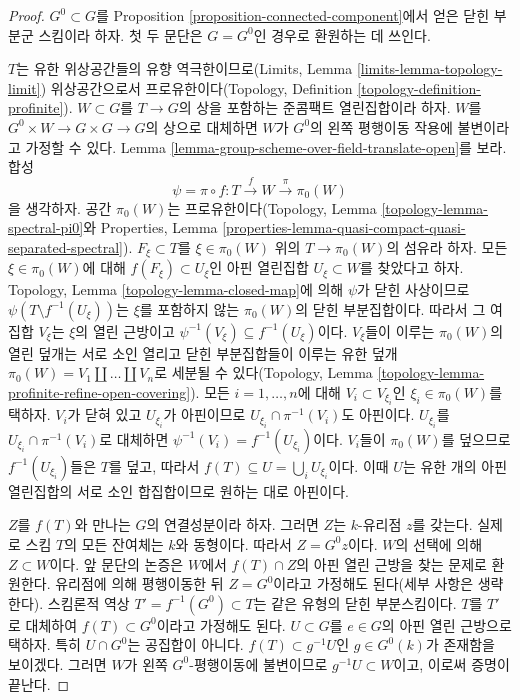 \begin{proof}
$G^0 \subset G$를 Proposition \ref{proposition-connected-component}에서 얻은 닫힌 부분군 스킴이라 하자.
첫 두 문단은 $G = G^0$인 경우로 환원하는 데 쓰인다.

\medskip\noindent
$T$는 유한 위상공간들의 유향 역극한이므로(Limits, Lemma
\ref{limits-lemma-topology-limit}) 위상공간으로서 프로유한이다(Topology, Definition
\ref{topology-definition-profinite}). $W \subset G$를 $T \to G$의 상을 포함하는 준콤팩트 열린집합이라 하자.
$W$를 $G^0 \times W \to G \times G \to G$의 상으로 대체하면 $W$가 $G^0$의 왼쪽 평행이동 작용에
불변이라고 가정할 수 있다. Lemma \ref{lemma-group-scheme-over-field-translate-open}를 보라.
합성
$$
\psi = \pi \circ f : T \xrightarrow{f} W \xrightarrow{\pi} \pi_0(W)
$$
을 생각하자. 공간 $\pi_0(W)$는 프로유한이다(Topology, Lemma
\ref{topology-lemma-spectral-pi0}와 Properties, Lemma
\ref{properties-lemma-quasi-compact-quasi-separated-spectral}). $F_\xi \subset T$를
$\xi \in \pi_0(W)$ 위의 $T \to \pi_0(W)$의 섬유라 하자. 모든 $\xi \in \pi_0(W)$에 대해
$f(F_\xi) \subset U_\xi$인 아핀 열린집합 $U_\xi \subset W$를 찾았다고 하자. Topology, Lemma
\ref{topology-lemma-closed-map}에 의해 $\psi$가 닫힌 사상이므로
$\psi(T \setminus f^{-1}(U_\xi))$는 $\xi$를 포함하지 않는 $\pi_0(W)$의 닫힌 부분집합이다.
따라서 그 여집합 $V_\xi$는 $\xi$의 열린 근방이고
$\psi^{-1}(V_\xi) \subseteq f^{-1}(U_\xi)$이다. $V_\xi$들이 이루는 $\pi_0(W)$의 열린 덮개는
서로 소인 열리고 닫힌 부분집합들이 이루는 유한 덮개
$\pi_0(W) = V_1 \amalg \ldots \amalg V_n$로 세분될 수 있다(Topology, Lemma
\ref{topology-lemma-profinite-refine-open-covering}). 모든 $i = 1, \ldots, n$에 대해
$V_i \subset V_{\xi_i}$인 $\xi_i \in \pi_0(W)$를 택하자. $V_i$가 닫혀 있고 $U_{\xi_i}$가 아핀이므로
$U_{\xi_i} \cap \pi^{-1}(V_i)$도 아핀이다. $U_{\xi_i}$를 $U_{\xi_i} \cap \pi^{-1}(V_i)$로 대체하면
$\psi^{-1}(V_i) = f^{-1}(U_{\xi_i})$이다. $V_i$들이 $\pi_0(W)$를 덮으므로 $f^{-1}(U_{\xi_i})$들은
$T$를 덮고, 따라서 $f(T) \subseteq U = \bigcup_i U_{\xi_i}$이다. 이때 $U$는 유한 개의 아핀 열린집합의
서로 소인 합집합이므로 원하는 대로 아핀이다.

\medskip\noindent
$Z$를 $f(T)$와 만나는 $G$의 연결성분이라 하자. 그러면 $Z$는 $k$-유리점 $z$를 갖는다.
실제로 스킴 $T$의 모든 잔여체는 $k$와 동형이다. 따라서 $Z = G^0 z$이다. $W$의 선택에 의해
$Z \subset W$이다. 앞 문단의 논증은 $W$에서 $f(T) \cap Z$의 아핀 열린 근방을 찾는 문제로 환원한다.
유리점에 의해 평행이동한 뒤 $Z = G^0$이라고 가정해도 된다(세부 사항은 생략한다).
스킴론적 역상 $T' = f^{-1}(G^0) \subset T$는 같은 유형의 닫힌 부분스킴이다.
$T$를 $T'$로 대체하여 $f(T) \subset G^0$이라고 가정해도 된다. $U \subset G$를
$e \in G$의 아핀 열린 근방으로 택하자. 특히 $U \cap G^0$는 공집합이 아니다.
$f(T) \subset g^{-1}U$인 $g \in G^0(k)$가 존재함을 보이겠다. 그러면 $W$가 왼쪽
$G^0$-평행이동에 불변이므로 $g^{-1}U \subset W$이고, 이로써 증명이 끝난다.


\end{proof}
